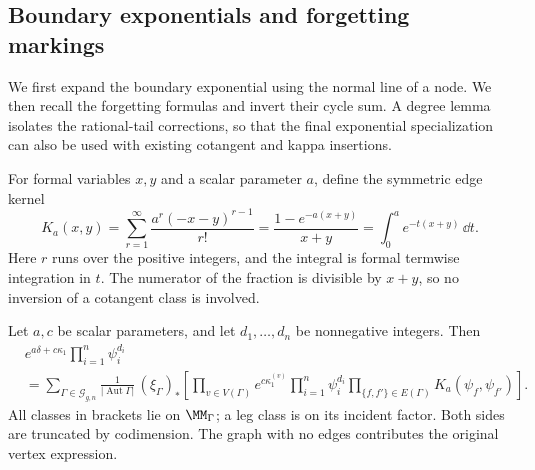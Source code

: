 \subsection{Boundary exponentials and forgetting markings}
\label{subsec:s02:04}

We first expand the boundary exponential using the normal line of a
node.  We then recall the forgetting formulas and invert their cycle
sum.  A degree lemma isolates the rational-tail corrections, so that
the final exponential specialization can also be used with existing
cotangent and kappa insertions.

For formal variables $x,y$ and a scalar parameter $a$, define the
symmetric edge kernel
\begin{equation}
\label{eq:s02:edge-kernel}
K_a(x,y)=\sum_{r=1}^{\infty}\frac{a^r(-x-y)^{r-1}}{r!}
=\frac{1-e^{-a(x+y)}}{x+y}
=\int_0^a e^{-t(x+y)}\,\dd t.
\end{equation}
Here $r$ runs over the positive integers, and the integral is formal
termwise integration in $t$.  The numerator of the fraction is
divisible by $x+y$, so no inversion of a cotangent class is involved.

\begin{prp}
\label{prp:s02:boundary-exponential}
Let $a,c$ be scalar parameters, and let $d_1,\ldots,d_n$ be
nonnegative integers.  Then
\begin{equation}
\label{eq:s02:boundary-exponential}
\begin{split}
&e^{a\delta+c\kappa_1}\prod_{i=1}^n\psi_i^{d_i}\\
&=\sum_{\Gamma\in\mathcal G_{g,n}}
\frac{1}{|\operatorname{Aut}\Gamma|}\,
(\xi_\Gamma)_*\left[
\prod_{v\in V(\Gamma)}e^{c\kappa_1^{(v)}}
\prod_{i=1}^n\psi_i^{d_i}
\prod_{\{f,f'\}\in E(\Gamma)}K_a(\psi_f,\psi_{f'})
\right].
\end{split}
\end{equation}
All classes in brackets lie on $\MM_\Gamma$; a leg class is on its
incident factor.  Both sides are truncated by codimension.  The graph
with no edges contributes the original vertex expression.
\end{prp}

